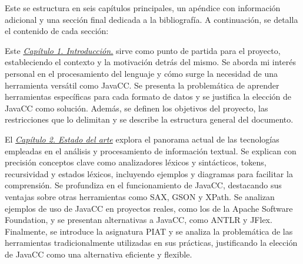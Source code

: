 





\noindent Este \pfg se estructura en seis capítulos principales, un apéndice con información adicional y una sección final dedicada a la bibliografía. A continuación, se detalla el contenido de cada sección:

Este \hyperref[sec:cap1]{\textit{Capítulo 1. Introducción.}} sirve como punto de partida para el proyecto, estableciendo el contexto y la motivación detrás del mismo. Se aborda mi interés personal en el procesamiento del lenguaje y cómo surge la necesidad de una herramienta versátil como JavaCC. Se presenta la problemática de aprender herramientas específicas para cada formato de datos y se justifica la elección de JavaCC como solución. Además, se definen los objetivos del proyecto, las restricciones que lo delimitan y se describe la estructura general del documento.

El \hyperref[sec:cap2]{\textit{Capítulo 2. Estado del arte}} explora el panorama actual de las tecnologías empleadas en el análisis y procesamiento de información textual. Se explican con precisión conceptos clave como analizadores léxicos y sintácticos, tokens, recursividad y estados léxicos, incluyendo ejemplos y diagramas para facilitar la comprensión. Se profundiza en el funcionamiento de JavaCC, destacando sus ventajas sobre otras herramientas como SAX, GSON y XPath. Se analizan ejemplos de uso de JavaCC en proyectos reales, como los de la Apache Software Foundation, y se presentan alternativas a JavaCC, como ANTLR y JFlex. Finalmente, se introduce la asignatura PIAT y se analiza la problemática de las herramientas tradicionalmente utilizadas en sus prácticas, justificando la elección de JavaCC como una alternativa eficiente y flexible.

